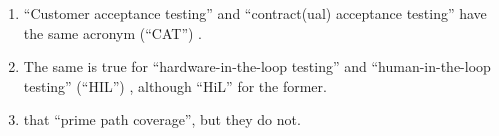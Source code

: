 \begin{enumerate}
    \item %
          ``Customer acceptance testing'' and ``contract(ual) acceptance
          testing'' have the same acronym (``CAT'') \citep[p.~30]{Firesmith2015}.
    \item %
          The same is true for ``hardware-in-the-loop testing'' and
          ``human-in-the-loop testing'' (``HIL'') \citep[p.~23]{Firesmith2015},
          although \citet[p.~2] {PreußeEtAl2012}  ``HiL''
          for the former.
    \item %
          \citet[p.~184]{DoğanEtAl2014}  that
          \citet{SakamotoEtAl2013}  ``prime path
          coverage'', but they do not.


\end{enumerate}
